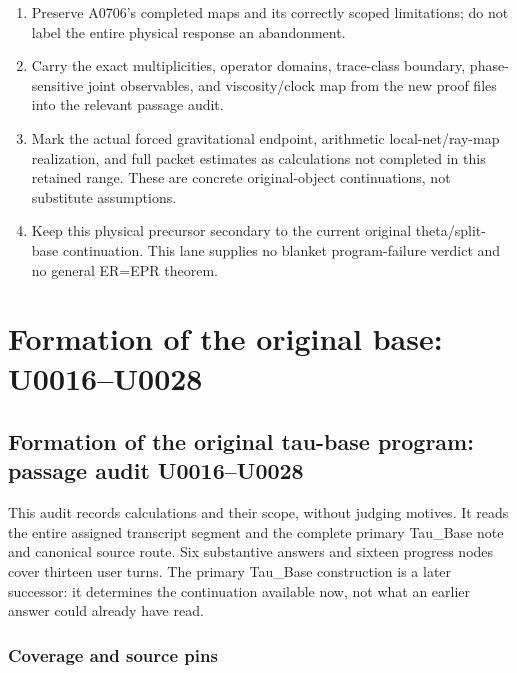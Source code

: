 \begin{enumerate}
\def\labelenumi{\arabic{enumi}.}
\tightlist
\item
  Preserve A0706's completed maps and its correctly scoped limitations;
  do not label the entire physical response an abandonment.
\item
  Carry the exact multiplicities, operator domains, trace-class
  boundary, phase-sensitive joint observables, and viscosity/clock map
  from the new proof files into the relevant passage audit.
\item
  Mark the actual forced gravitational endpoint, arithmetic
  local-net/ray-map realization, and full packet estimates as
  calculations not completed in this retained range. These are concrete
  original-object continuations, not substitute assumptions.
\item
  Keep this physical precursor secondary to the current original
  theta/split-base continuation. This lane supplies no blanket
  program-failure verdict and no general ER=EPR theorem.
\end{enumerate}

\clearpage

\section{Formation of the original base:
U0016--U0028}\label{formation-of-the-original-base-u0016u0028}

\subsection{Formation of the original tau-base program: passage audit
U0016--U0028}\label{formation-of-the-original-tau-base-program-passage-audit-u0016u0028}

This audit records calculations and their scope, without judging
motives. It reads the entire assigned transcript segment and the
complete primary Tau\_Base note and canonical source route. Six
substantive answers and sixteen progress nodes cover thirteen user
turns. The primary Tau\_Base construction is a later successor: it
determines the continuation available now, not what an earlier answer
could already have read.

\subsubsection{Coverage and source pins}\label{coverage-and-source-pins}


